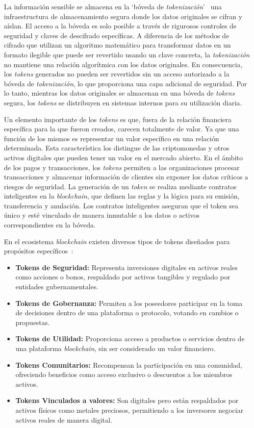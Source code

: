 La información sensible se almacena en la `bóveda de \textit{tokenización}'~\cite{bóvedaTokenización} una infraestructura de almacenamiento segura donde los datos originales se cifran y aíslan. El acceso a la bóveda es solo posible a través de rigurosos controles de seguridad y claves de descifrado específicas.
A diferencia de los métodos de cifrado que utilizan un algoritmo matemático para transformar datos en un formato ilegible que puede ser revertido usando un clave concreta, la \textit{tokenización} no mantiene una relación algorítmica con los datos originales. En consecuencia, los \textit{tokens} generados no pueden ser revertidos sin un acceso autorizado a la bóveda de \textit{tokenización}, lo que proporciona una capa adicional de seguridad.
Por lo tanto, mientras los datos originales se almacenan en una bóveda de \textit{tokens} segura, los \textit{tokens} se distribuyen en sistemas internos para su utilización diaria.

Un elemento importante de los \textit{tokens} es que, fuera de la relación financiera específica para la que fueron creados, carecen totalmente de valor. Ya que una función de los mismos es representar un valor específico en una relación determinada. Esta característica los distingue de las criptomonedas y otros activos digitales que pueden tener un valor en el mercado abierto.
En el ámbito de los pagos y transacciones, los \textit{tokens} permiten a las organizaciones procesar transacciones y almacenar información de clientes sin exponer los datos críticos a riesgos de seguridad.
La generación de un \textit{token} se realiza mediante contratos inteligentes en la \textit{blockchain}, que definen las reglas y la lógica para su emisión, transferencia y anulación. Los contratos inteligentes aseguran que el token sea único y esté vinculado de manera inmutable a los datos o activos correspondientes en la bóveda.

En el ecosistema \textit{blockchain} existen diversos tipos de tokens diseñados para propósitos específicos~\cite{tiposToken}:

\begin{itemize}
\item \textbf{Tokens de Seguridad:} Representa inversiones digitales en activos reales como acciones o bonos, respaldado por activos tangibles y regulado por entidades gubernamentales.
\item \textbf{Tokens de Gobernanza:} Permiten a los poseedores participar en la toma de decisiones dentro de una plataforma o protocolo, votando en cambios o propuestas.
\item \textbf{Tokens de Utilidad:} Proporciona acceso a productos o servicios dentro de una plataforma \textit{blockchain}, sin ser considerado un valor financiero.
\item \textbf{Tokens Comunitarios:} Recompensan la participación en una comunidad, ofreciendo beneficios como acceso exclusivo o descuentos a los miembros activos.
\item \textbf{Tokens Vinculados a valores:} Son digitales pero están respaldados por activos físicos como metales preciosos, permitiendo a los inversores negociar activos reales de manera digital.

\end{itemize}

